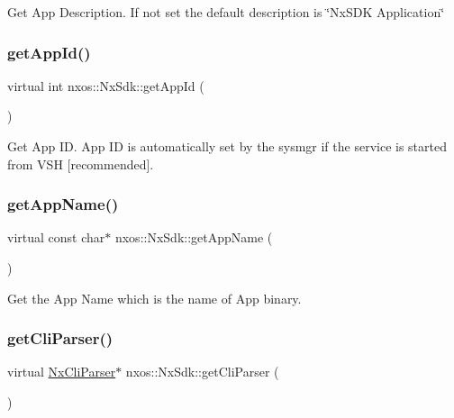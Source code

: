 Get App Description. If not set the default description is \char`\"{}\+Nx\+S\+D\+K Application\char`\"{} \mbox{\label{classnxos_1_1_nx_sdk_ac82af6d262439275f27c745082bf3fd7}} 
\subsubsection{\texorpdfstring{get\+App\+Id()}{getAppId()}}
{\footnotesize\ttfamily virtual int nxos\+::\+Nx\+Sdk\+::get\+App\+Id (\begin{DoxyParamCaption}{ }\end{DoxyParamCaption})\hspace{0.3cm}{\ttfamily [pure virtual]}}

Get App ID. App ID is automatically set by the sysmgr if the service is started from V\+SH \mbox{[}recommended\mbox{]}. \mbox{\label{classnxos_1_1_nx_sdk_a9ba7da2cd8cb4f82438135ee651efdb0}} 
\subsubsection{\texorpdfstring{get\+App\+Name()}{getAppName()}}
{\footnotesize\ttfamily virtual const char$\ast$ nxos\+::\+Nx\+Sdk\+::get\+App\+Name (\begin{DoxyParamCaption}{ }\end{DoxyParamCaption})\hspace{0.3cm}{\ttfamily [pure virtual]}}

Get the App Name which is the name of App binary. \mbox{\label{classnxos_1_1_nx_sdk_a98bcb70d1bf60e38b41eacdf0a72dc89}} 
\subsubsection{\texorpdfstring{get\+Cli\+Parser()}{getCliParser()}}
{\footnotesize\ttfamily virtual \mbox{\hyperlink{classnxos_1_1_nx_cli_parser}{Nx\+Cli\+Parser}}$\ast$ nxos\+::\+Nx\+Sdk\+::get\+Cli\+Parser (\begin{DoxyParamCaption}{ }\end{DoxyParamCaption})\hspace{0.3cm}{\ttfamily [pure virtual]}}

